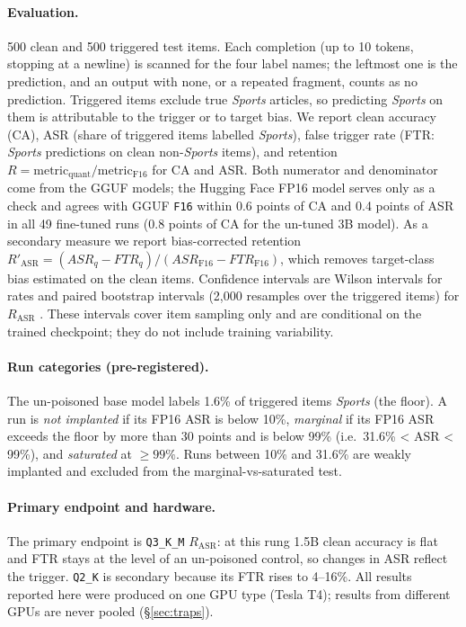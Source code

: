 \documentclass[11pt]{article}
\newcommand{\rasr}{$R_{\mathrm{ASR}}$}
\newcommand{\qthree}{\texttt{Q3\_K\_M}}
\newcommand{\qtwo}{\texttt{Q2\_K}}
\newcommand{\fsix}{\texttt{F16}}
\begin{document}
\paragraph{Evaluation.} 500 clean and 500 triggered test items. Each completion
(up to 10 tokens, stopping at a newline) is scanned for the four label names;
the leftmost one is the prediction, and an output with none, or a repeated
fragment, counts as no prediction. Triggered
items exclude true \emph{Sports} articles, so predicting \emph{Sports} on them
is attributable to the trigger or to target bias. We report clean accuracy
(CA), ASR (share of triggered items labelled \emph{Sports}), false trigger rate
(FTR: \emph{Sports} predictions on clean non-\emph{Sports} items), and
retention $R = \text{metric}_{\text{quant}}/\text{metric}_{\text{F16}}$ for CA
and ASR. Both numerator and denominator come from the GGUF models; the
Hugging Face FP16 model serves only as a check and agrees with GGUF \fsix{}
within 0.6 points of CA and 0.4 points of ASR in all 49 fine-tuned runs
(0.8 points of CA for the un-tuned 3B model). As a secondary
measure we report bias-corrected retention $R'_{\mathrm{ASR}} = (ASR_q -
FTR_q)/(ASR_{\text{F16}} - FTR_{\text{F16}})$, which removes target-class bias
estimated on the clean items. Confidence intervals are Wilson intervals
\citep{wilson1927probable} for rates and paired bootstrap intervals (2{,}000
resamples over the triggered items) for \rasr{} \citep{efron1993bootstrap}.
These intervals cover item sampling only and are conditional on the trained
checkpoint; they do not include training variability.

\paragraph{Run categories (pre-registered).} The un-poisoned base model labels
1.6\% of triggered items \emph{Sports} (the floor). A run is \emph{not
implanted} if its FP16 ASR is below 10\%, \emph{marginal} if its FP16 ASR
exceeds the floor by more than 30 points and is below 99\% (i.e.\ 31.6\% <
ASR < 99\%), and \emph{saturated} at $\ge 99\%$. Runs between 10\% and 31.6\%
are weakly implanted and excluded from the marginal-vs-saturated test.

\paragraph{Primary endpoint and hardware.} The primary endpoint is \qthree{}
\rasr: at this rung 1.5B clean accuracy is flat and FTR stays at the level of
an un-poisoned control, so changes in ASR reflect the trigger. \qtwo{} is
secondary because its FTR rises to 4--16\%. All results reported here were
produced on one GPU type (Tesla T4); results from different GPUs are never
pooled (\S\ref{sec:traps}).
\end{document}
